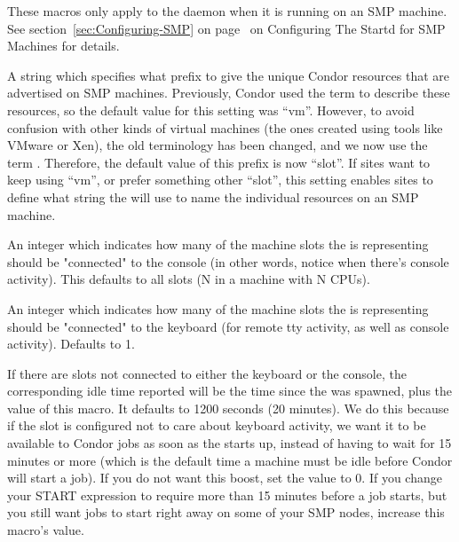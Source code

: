 These macros only apply to the  daemon when it is running on an
SMP machine. 
See section~\ref{sec:Configuring-SMP} on
page~\pageref{sec:Configuring-SMP} on Configuring The Startd for 
SMP Machines for details.

\begin{description}

\label{param:StartdResourcePrefix}
\item[\Macro{STARTD\_RESOURCE\_PREFIX}] 
  A string which specifies what prefix to give the unique Condor
  resources that are advertised on SMP machines.
  Previously, Condor used the term  to describe
  these resources, so the default value for this setting was ``vm''.
  However, to avoid confusion with other kinds of virtual machines
  (the ones created using tools like VMware or Xen), the old
   terminology has been changed, and we now use
  the term .
  Therefore, the default value of this prefix is now ``slot''.
  If sites want to keep using ``vm'', or prefer something other
  ``slot'', this setting enables sites to define what string the
   will use to name the individual resources on an SMP
  machine.

\label{param:SlotsConnectedToConsole}
\item[\Macro{SLOTS\_CONNECTED\_TO\_CONSOLE}] 
  An integer which indicates how many of the machine slots
  the  is representing should be "connected" to the
  console (in other words, notice when there's console activity).
  This defaults to all slots (N in a machine with N CPUs).

\label{param:SlotsConnectedToKeyboard}
\item[\Macro{SLOTS\_CONNECTED\_TO\_KEYBOARD}]
  An integer which indicates how many of the machine slots
  the  is representing should be "connected" to the
  keyboard (for remote tty activity, as well as console activity).
  Defaults to 1.

\label{param:DisconnectedKeyboardIdleBoost}
\item[\Macro{DISCONNECTED\_KEYBOARD\_IDLE\_BOOST}]
  If there are slots not connected to either the keyboard
  or the console, the corresponding idle time reported will be the
  time since the  was spawned, plus the value of this macro.
  It defaults to 1200 seconds (20 minutes). 
  We do this because if the slot is configured not to care
  about keyboard activity, we want it to be available to Condor jobs
  as soon as the  starts up, instead of having to wait for 15
  minutes or more (which is the default time a machine must be idle
  before Condor will start a job).
  If you do not want this boost, set the value to 0.  
  If you change your START expression to require more than 15 minutes
  before a job starts, but you still want jobs to start right away on
  some of your SMP nodes, increase this macro's value.


\end{description}
